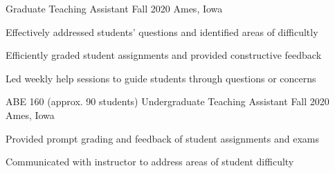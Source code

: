 \begin{cventries}
    {Graduate Teaching Assistant} %
    {Fall 2020} %
    {Ames, Iowa} %
    {
      \begin{cvitems} %
      \setlength\itemsep{.4em}
        \item {Effectively addressed students’ questions and identified areas of difficultly}
        \item {Efficiently graded student assignments and provided constructive feedback}
        \item {Led weekly help sessions to guide students through questions or concerns}
      \end{cvitems}
    }
\vspace*{.5cm}
 \cventry
    {ABE 160 (approx. 90 students)} %
    {Undergraduate Teaching Assistant} %
    {Fall 2020} %
    {Ames, Iowa} %
    {
      \begin{cvitems} %
      \setlength\itemsep{.4em}
        \item {Provided prompt grading and feedback of student assignments and exams}
        \item {Communicated with instructor to address areas of student difficulty}
      \end{cvitems}
    }
\end{cventries}
